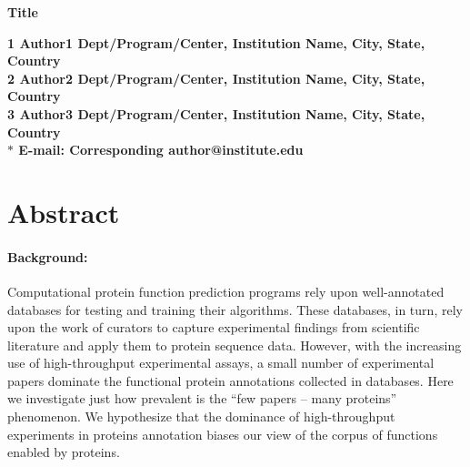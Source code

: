 \documentclass[12pt]{article}
\date{}
\begin{document}
\begin{flushleft}
{\Large
\textbf{Title}
}
\\
\author{Alexandra Schnoes$^1$%
         David C. Ream$^2$%
      \and
         Alexander Thorman$^2$%
      \and
         Patricia Babbitt$^1$%
       \and 
        Iddo Friedberg\correspondingauthor$^{2,3}$%
      }
      

\bf{1} Author1 Dept/Program/Center, Institution Name, City, State, Country
\\
\bf{2} Author2 Dept/Program/Center, Institution Name, City, State, Country
\\
\bf{3} Author3 Dept/Program/Center, Institution Name, City, State, Country
\\
$\ast$ E-mail: Corresponding author@institute.edu
\end{flushleft}

\section*{Abstract}

        \paragraph*{Background:} Computational protein function
prediction programs rely upon well-annotated databases for testing and training
their algorithms. These databases, in turn, rely upon the work of curators
to capture experimental findings from scientific literature and apply them to protein
sequence data. However, with the increasing use of high-throughput experimental
assays,  a small number of experimental papers dominate
the functional protein annotations collected in databases. 
Here we investigate just how prevalent is the ``few papers --
many proteins'' phenomenon. We hypothesize that the dominance of high-throughput experiments in
proteins annotation biases our view of the corpus of functions enabled by proteins.
      
\end{document}
